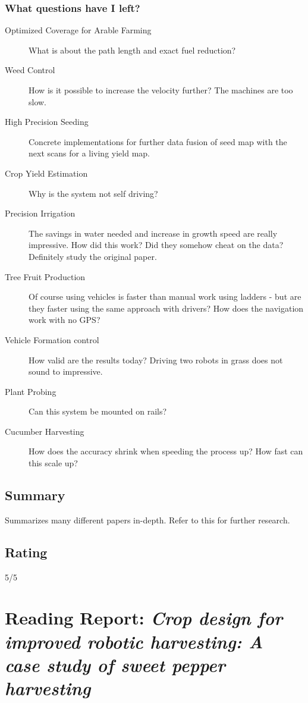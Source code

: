 \subsubsection*{What questions have I left?}
\begin{description}

    \item[Optimized Coverage for Arable Farming] What is about the path length and exact fuel reduction?
    \item[Weed Control] How is it possible to increase the velocity further? The machines are too slow.
    \item[High Precision Seeding] Concrete implementations for further data fusion of seed map with the next scans for a living yield map.
    \item[Crop Yield Estimation] Why is the system not self driving?
    \item[Precision Irrigation] The savings in water needed and increase in growth speed are really impressive. How did this work? Did they somehow cheat on the data?
    Definitely study the original paper. 
    \item[Tree Fruit Production] Of course using vehicles is faster than manual work using ladders - but are they faster using the same approach with drivers? How does the navigation work with no GPS?
    \item[Vehicle Formation control] How valid are the results today? Driving two robots in grass does not sound to impressive.
    \item[Plant Probing] Can this system be mounted on rails?
    \item[Cucumber Harvesting] How does the accuracy shrink when speeding the process up? How fast can this scale up? 

\end{description} 


\subsection*{Summary} 
Summarizes many different papers in-depth. Refer to this for further research.

\subsection*{Rating}
5/5


\section{Reading Report: \emph{Crop design for improved robotic harvesting: A case study of sweet pepper harvesting}}
\cite{Herck2020}

